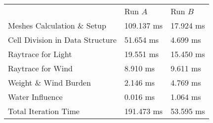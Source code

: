 \documentclass[11pt, abstract=on]{scrartcl}
\begin{document}
\begin{center}
\begin{tabular}{ | l | l l |}
\hline
	& Run $A$ & Run $B$\\
\cline{2-3}
  Meshes Calculation \& Setup  & 109.137 ms & 17.924 ms\\
  Cell Division in Data Structure & 51.654 ms & 4.699 ms\\
  Raytrace for Light & 19.551 ms & 15.450 ms\\
  Raytrace for Wind & 8.910 ms & 9.611 ms \\
  Weight \& Wind Burden & 2.146 ms & 4.769 ms\\
  Water Influence & 0.016 ms & 1.064 ms\\
  Total Iteration Time & 191.473 ms & 53.595 ms\\
\hline
\end{tabular}
\end{center}
\end{document}
